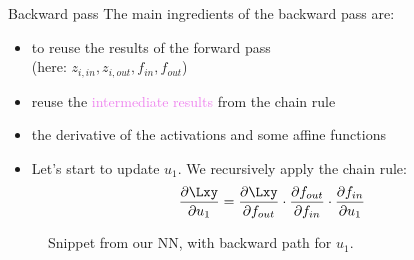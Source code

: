 \begin{vbframe}{Backward pass}
   The main ingredients of the backward pass are: 
    \begin{itemize}
      \item to reuse the results of the forward pass \\ (here:  ${z_{i, in}, z_{i, out}, f_{in},f_{out}}$)
      \item reuse the \textcolor{violet}{intermediate results} from the chain rule 
      \item the derivative of the activations and some affine functions
    \end{itemize}
\framebreak

  \begin{itemize}
    \item Let's start to update $u_1$. We recursively apply the chain rule: $$\frac{\partial \Lxy}{\partial u_1} = \frac{\partial \Lxy}{\partial f_{out}} \cdot \frac{\partial f_{out}}{\partial f_{in}} \cdot \frac{\partial f_{in}}{\partial u_1}$$
  \end{itemize}
  \begin{figure}
    \centering
      \caption{\footnotesize{Snippet from our NN, with backward path for $u_1$.}}
  \end{figure}
\framebreak


\end{vbframe}
